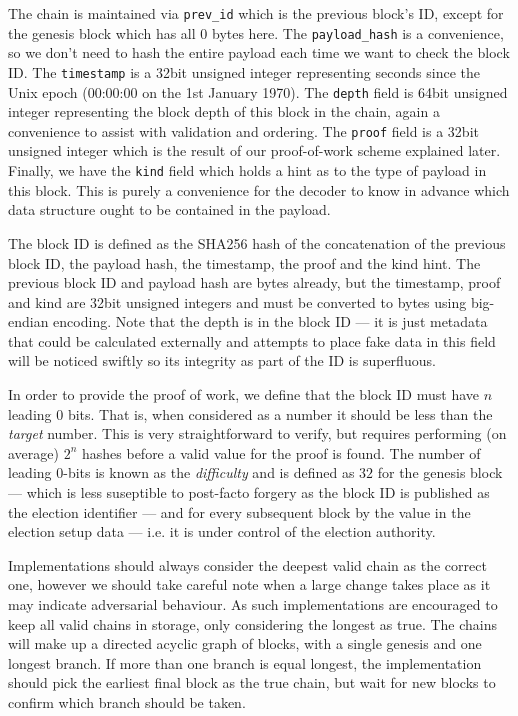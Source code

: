 The chain is maintained via \texttt{prev\_id} which is the previous block's ID, except for the genesis block which has all $0$ bytes here. The \texttt{payload\_hash} is a convenience, so we don't need to hash the entire payload each time we want to check the block ID. The \texttt{timestamp} is a 32bit unsigned integer representing seconds since the Unix epoch (00:00:00 on the 1st January 1970). The \texttt{depth} field is 64bit unsigned integer representing the block depth of this block in the chain, again a convenience to assist with validation and ordering. The \texttt{proof} field is a 32bit unsigned integer which is the result of our proof-of-work scheme explained later. Finally, we have the \texttt{kind} field which holds a hint as to the type of payload in this block. This is purely a convenience for the decoder to know in advance which data structure ought to be contained in the payload.

The block ID is defined as the SHA256 hash of the concatenation of the previous block ID, the payload hash, the timestamp, the proof and the kind hint. The previous block ID and payload hash are bytes already, but the timestamp, proof and kind are 32bit unsigned integers and must be converted to bytes using big-endian encoding. Note that the depth is in the block ID --- it is just metadata that could be calculated externally and attempts to place fake data in this field will be noticed swiftly so its integrity as part of the ID is superfluous.

In order to provide the proof of work, we define that the block ID must have $n$ leading 0 bits. That is, when considered as a number it should be less than the \emph{target} number. This is very straightforward to verify, but requires performing (on average) $2^n$ hashes before a valid value for the proof is found. The number of leading 0-bits is known as the \emph{difficulty} and is defined as $32$ for the genesis block --- which is less suseptible to post-facto forgery as the block ID is published as the election identifier --- and for every subsequent block by the value in the election setup data --- i.e. it is under control of the election authority.

Implementations should always consider the deepest valid chain as the correct one, however we should take careful note when a large change takes place as it may indicate adversarial behaviour. As such implementations are encouraged to keep all valid chains in storage, only considering the longest as true. The chains will make up a directed acyclic graph of blocks, with a single genesis and one longest branch. If more than one branch is equal longest, the implementation should pick the earliest final block as the true chain, but wait for new blocks to confirm which branch should be taken.